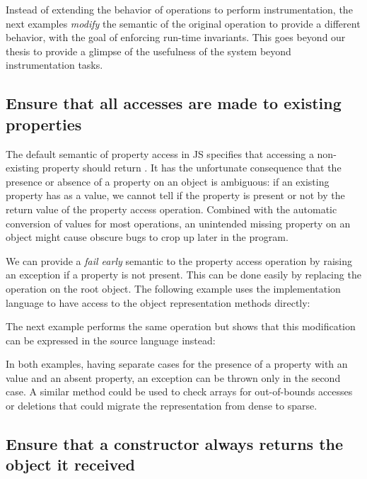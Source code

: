 Instead of extending the behavior of operations to perform instrumentation, the
next examples \textit{modify} the semantic of the original operation to provide
a different behavior, with the goal of enforcing run-time invariants. This goes
beyond our thesis to provide a glimpse of the usefulness of the system beyond
instrumentation tasks.

\subsection{Ensure that all accesses are made to existing properties}

The default semantic of property access in JS specifies that accessing
a non-existing property should return . It has the unfortunate
consequence that the presence or absence of a property on an object is
ambiguous: if an existing property has  as a value, we cannot
tell if the property is present or not by the return value of the property
access operation. Combined with the automatic conversion of values for most
operations, an unintended missing property on an object might cause obscure
bugs to crop up later in the program.

We can provide a \textit{fail early} semantic to the property access operation
by raising an exception if a property is not present. This can be done easily
by replacing the  operation on the root object. The following
example uses the implementation language to have access to the object
representation methods directly:


The next example performs the same operation but shows that this modification 
can be expressed in the source language instead:


In both examples, having separate cases for the presence of a property with an
 value and an absent property, an exception can be thrown only in
the second case. A similar method could be used to check arrays for
out-of-bounds accesses or deletions that could migrate the representation from
dense to sparse.

\subsection{Ensure that a constructor always returns the object it received}

